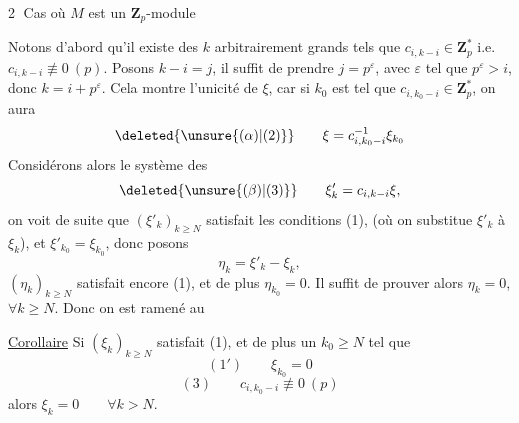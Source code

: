 \textcircled{2} Cas où $M$ est un $\mathbf Z_p$-module

Notons d'abord qu'il existe des $k$ arbitrairement grands tels que $c_{i,k-i}\in\mathbf Z_p^*$ i.e. $c_{i,k-i}\not\equiv0\ (p)$. Posons $k-i=j$, il suffit de prendre $j=p^\varepsilon$, avec $\varepsilon$ tel que $p^\varepsilon>i$, donc $k=i+p^\varepsilon$. Cela montre l'unicité de $\xi$, car si $k_0$ est tel que $c_{i,k_0-i}\in\mathbf Z_p^*$, on aura
\[
\deleted{\unsure{(\alpha)|(2)}}\qquad\xi=c_{i,k_0-i}^{-1}\xi_{k_0}
\]
Considérons alors le système des
\[
\deleted{\unsure{(\beta)|(3)}}\qquad\xi'_k=c_{i,k-i}\xi,
\]
on voit de suite  que  $(\xi'_k)_{k\geq N}$ satisfait les conditions (1), (où on substitue $\xi'_k$ à $\xi_k$), et $\xi'_{k_0}=\xi_{k_0}$, donc posons
\[
\eta_k=\xi'_k-\xi_k,
\]
 $(\eta_k)_{k\geq N}$ satisfait encore (1), et de plus $\eta_{k_0}=0$. Il suffit de prouver alors $\eta_k=0$,  $\forall k\geq N$. Donc on est ramené au

\uline{Corollaire} Si $(\xi_k)_{k\geq N}$  satisfait (1), et  de plus   un $k_0\geq N$ tel que
\[
(1')\qquad\xi_{k_0}=0
\]
\[
(3)\qquad c_{i,k_0-i}\not\equiv0\ (p)
\]
alors $\xi_k=0\qquad\forall k>N$.
